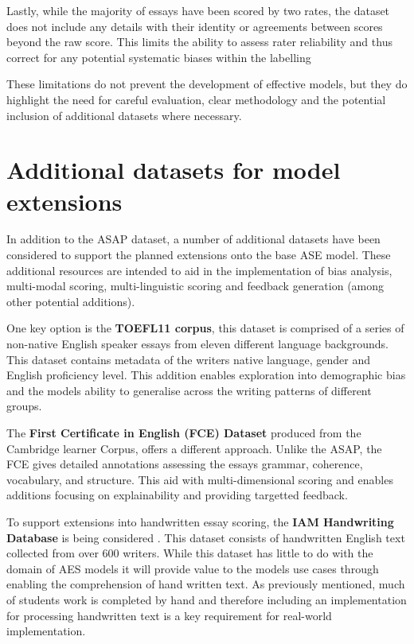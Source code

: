 \documentclass[10pt]{report}
\begin{document}
Lastly, while the majority of essays have been scored by two rates, the dataset does not include any details with their identity or agreements between scores beyond the raw score. This limits the ability to assess rater reliability and thus correct for any potential systematic biases within the labelling

These limitations do not prevent the development of effective models, but they do highlight the need for careful evaluation, clear methodology and the potential inclusion of additional datasets where necessary.

\section{Additional datasets for model extensions}
In addition to the ASAP dataset, a number of additional datasets have been considered to support the planned extensions onto the base ASE model. These additional resources are intended to aid in the implementation of bias analysis, multi-modal scoring, multi-linguistic scoring and feedback generation (among other potential additions).

One key option is the \textbf{TOEFL11 corpus}, this dataset is comprised of a series of non-native English speaker essays from eleven different language backgrounds. This dataset contains metadata of the writers native language, gender and English proficiency level. This addition enables exploration into demographic bias and the models ability to generalise across the writing patterns of different groups\parencite{blanchard2013toefl}.

The \textbf{First Certificate in English (FCE) Dataset} produced from the Cambridge learner Corpus, offers a different approach. Unlike the ASAP, the FCE gives detailed annotations assessing the essays grammar, coherence, vocabulary, and structure. This aid with multi-dimensional scoring and enables additions focusing on explainability and providing targetted feedback.

To support extensions into handwritten essay scoring, the \textbf{IAM Handwriting Database} is being considered \parencite{marti2002iam}. This dataset consists of handwritten English text collected from over 600 writers. While this dataset has little to do with the domain of AES models it will provide value to the models use cases through enabling the comprehension of hand written text. As previously mentioned, much of students work is completed by hand and therefore including an implementation for processing handwritten text is a key requirement for real-world implementation.
\end{document}
